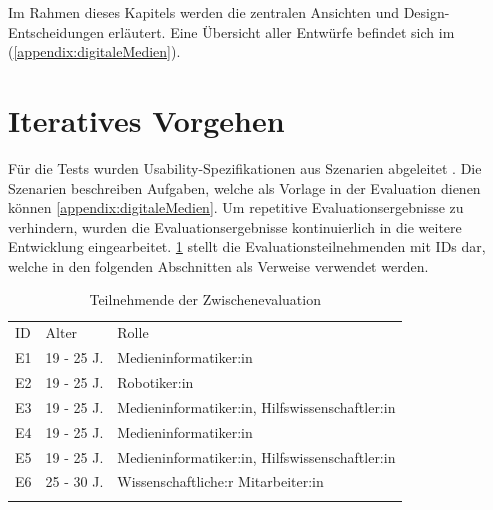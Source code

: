 Im Rahmen dieses Kapitels werden die zentralen Ansichten und
Design-Entscheidungen erläutert. Eine Übersicht aller Entwürfe befindet sich im
(\ref{appendix:digitaleMedien}).

\section{Iteratives Vorgehen}
Für die Tests wurden Usability-Spezifikationen aus Szenarien abgeleitet
\cite{rosson_usability_2002}. Die Szenarien beschreiben Aufgaben, welche als
Vorlage in der Evaluation dienen können \ref{appendix:digitaleMedien}. Um
repetitive Evaluationsergebnisse zu verhindern, wurden die Evaluationsergebnisse
kontinuierlich in die weitere Entwicklung eingearbeitet. \ref{table:e} stellt
die Evaluationsteilnehmenden mit IDs dar, welche in den folgenden Abschnitten
als Verweise verwendet werden.

\begin{table}[h]
    \centering
    \caption{Teilnehmende der Zwischenevaluation}
    \begin{tabular}{lll}
        \arrayrulecolor{maincolor}\hline
        \sffamily\color{maincolor}ID & \sffamily\color{maincolor}Alter &
        \sffamily\color{maincolor}Rolle
        \\
        \arrayrulecolor{maincolor}\hline
        E1                           & 19 - 25 J.                      &
        Medieninformatiker:in
        \\
        E2                           & 19 - 25 J.                      &
        Robotiker:in                                                     \\
        E3                           & 19 - 25 J.                      &
        Medieninformatiker:in, Hilfswissenschaftler:in                   \\
        E4                           & 19 - 25 J.                      &
        Medieninformatiker:in                                            \\
        E5                           & 19 - 25 J.                      &
        Medieninformatiker:in, Hilfswissenschaftler:in
        \\
        E6                           & 25 - 30 J.                      &
        Wissenschaftliche:r Mitarbeiter:in                               \\
        \arrayrulecolor{maincolor}\hline
    \end{tabular}
    \label{table:e}
\end{table}


